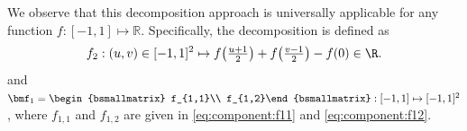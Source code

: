 \documentclass[review,hidelinks,onefignum,onetabnum]{siamart250211}
\begin{document}
We observe that this decomposition approach is universally applicable for any function $f:[-1,1]\mapsto\mathbb{R}$. Specifically, the decomposition is defined as
\begin{equation*}
    f_2:(u,v)\in[-1,1]^2\mapsto 
    f\big(\tfrac{u+1}{2}\big)+ f\big(\tfrac{v-1}{2}\big)-f(0)\in\R.
\end{equation*}
and 
$\bmf_1=\begin{bsmallmatrix}
    f_{1,1}\\  f_{1,2}\end{bsmallmatrix}:[-1,1]\mapsto[-1,1]^2$,
where $f_{1,1}$ and $f_{1,2}$ are given in \eqref{eq:component:f11} and \eqref{eq:component:f12}.
\end{document}
